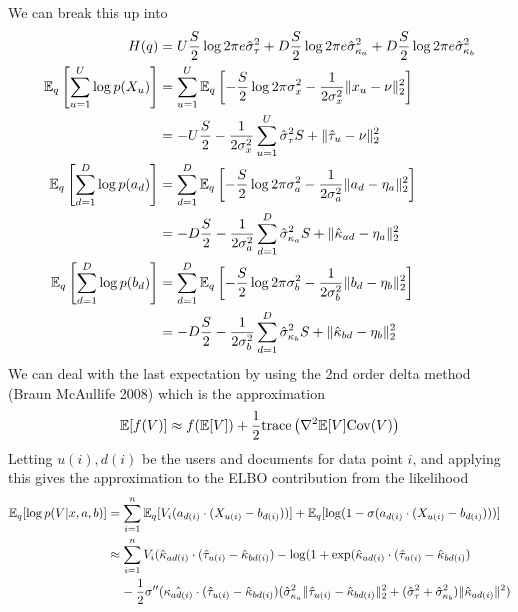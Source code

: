 \documentclass{article}
\begin{document}
We can break this up into 
\begin{align*}
H(q) & = U\frac{S}{2} \log 2\pi e\hat{\sigma}^2_\tau + D\frac{S}{2}\log 2\pi e\hat{\sigma}^2_{\kappa_a} + D\frac{S}{2}\log 2\pi e\hat{\sigma}^2_{\kappa_b}\\
\mathbb{E}_q\left[\sum_{u=1}^U \log p(X_{u})\right] & = \sum_{u=1}^U \mathbb{E}_q\left[-\frac{S}{2} \log 2\pi \sigma^2_x - \frac{1}{2\sigma^2_x} \|x_u - \nu\|_2^2\right]\\
& = -U\frac{S}{2} - \frac{1}{2\sigma^2_x} \sum_{u=1}^U \hat{\sigma}^2_\tau S + \|\hat{\tau}_u - \nu\|^2_2\\
\mathbb{E}_q\left[\sum_{d=1}^D \log p(a_d)\right] & = \sum_{d=1}^D \mathbb{E}_q\left[-\frac{S}{2} \log 2\pi \sigma^2_a - \frac{1}{2\sigma^2_a} \|a_d - \eta_a\|_2^2\right]\\
& = -D\frac{S}{2} - \frac{1}{2\sigma^2_a} \sum_{d=1}^D \hat{\sigma}^2_{\kappa_a} S + \|\hat{\kappa}_{ad} - \eta_a\|^2_2\\
\mathbb{E}_q\left[\sum_{d=1}^D \log p(b_d)\right] & = \sum_{d=1}^D \mathbb{E}_q\left[-\frac{S}{2} \log 2\pi \sigma^2_b - \frac{1}{2\sigma^2_b} \|b_d - \eta_b\|_2^2\right]\\
& = -D\frac{S}{2} - \frac{1}{2\sigma^2_b} \sum_{d=1}^D \hat{\sigma}^2_{\kappa_b} S + \|\hat{\kappa}_{bd} - \eta_b\|^2_2\\
\end{align*}
We can deal with the last expectation by using the 2nd order delta method (Braun McAullife 2008) which is the approximation
\begin{align*}
\mathbb{E}[f(V)] \approx f(\mathbb{E}[V]) + \frac{1}{2} \text{trace}\left(\nabla^2 \mathbb{E}[V] \mathrm{Cov}(V)\right)
\end{align*}
Letting $u(i),d(i)$ be the users and documents for data point $i$, and applying this gives the approximation to the ELBO contribution from the likelihood
\begin{align*}
\mathbb{E}_q[\log p(V|x,a,b)] & = \sum_{i=1}^n \mathbb{E}_q[V_i(a_{d(i)} \cdot (X_{u(i)} - b_{d(i)}))] + \mathbb{E}_q[\log (1-\sigma(a_{d(i)} \cdot (X_{u(i)} - b_{d(i)})))]\\
& \approx \sum_{i=1}^nV_i (\hat{\kappa}_{ad(i)} \cdot (\hat{\tau}_{u(i)} - \hat{\kappa}_{bd(i)}) - \log (1 + \exp(\hat{\kappa}_{ad(i)} \cdot (\hat{\tau}_{u(i)} - \hat{\kappa}_{bd(i)})\\
& \;\;\;\; - \frac{1}{2} \sigma''(\hat{\kappa_{ad(i)}} \cdot (\hat{\tau}_{u(i)} - \hat{\kappa}_{bd(i)})(\hat{\sigma}^2_{\kappa_a} \|\hat{\tau}_{u(i)} - \hat{\kappa}_{bd(i)}\|_2^2 + (\hat{\sigma}^2_{\tau} + \hat{\sigma}^2_{\kappa_b})\|\hat{\kappa}_{ad(i)}\|^2)
\end{align*}
\end{document}
